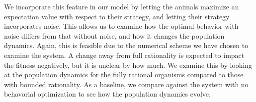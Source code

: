 We incorporate this feature in our model by letting the animals maximize an expectation value with respect to their strategy, and letting their strategy incorporates noise. This allows us to examine how the optimal behavior with noise differs from that without noise, and how it changes the population dynamics. Again, this is feasible due to the numerical scheme we have chosen to examine the system. A change away from full rationality is expected to impact the fitness negatively, but it is unclear by how much. We examine this by looking at the population dynamics for the fully rational organisms compared to those with bounded rationality. As a baseline, we compare against the system with no behavorial optimization to see how the population dynamics evolve.












